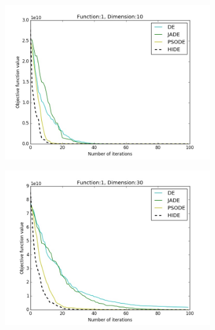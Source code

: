 \documentclass[a4paper,twoside]{article}
\begin{document}

\begin{figure}[h!]
    \centering
    \begin{subfigure}[b]{0.24\textwidth}
        \includegraphics[width=\textwidth,natwidth=800,natheight=600]{plot_10D_F1_save}
        \caption{}
    \end{subfigure}
    \begin{subfigure}[b]{0.24\textwidth}
        \includegraphics[width=\textwidth,natwidth=800,natheight=600]{plot_30D_F1_save}

\end{subfigure}
\end{figure}
\end{document}
